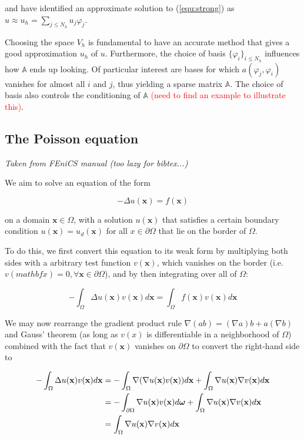 \documentclass[11pt, a4paper]{article}
\begin{document}
and have identified an approximate solution to (\ref{equ:strong}) as
$u \approx u_h = \sum_{j \leq N_h} u_j \varphi_j$.

Choosing the space $V_h$ is fundamental to have an accurate method that 
gives a good approximation $u_h$ of $u$. Furthermore, the choice of basis 
$\{\varphi_i\}_{i \leq N_h}$ influences how $\mathbb{A}$ ends up looking.
Of particular interest are bases for which $a(\varphi_j, \varphi_i)$ vanishes 
for almost all $i$ and $j$, thus yielding a sparse matrix $\mathbb{A}$. The
choice of basis also controls the conditioning of $\mathbb{A}$
\textcolor{red}{(need to find an example to illustrate this)}.

\subsection{The Poisson equation}
\label{subsec:poisson}

\textit{Taken from FEniCS manual (too lazy for bibtex...)}

We aim to solve an equation of the form

\begin{equation}
    - \Delta u(\mathbf{x}) = f(\mathbf{x}) \label{equ:poisson}
\end{equation}

on a domain $\mathbf{x} \in \Omega$, with a solution $u(\mathbf{x})$
that satisfies a certain boundary condition $u(\mathbf{x}) = u_d(\mathbf{x})$
for all $x \in \partial \Omega$ that lie on the border of $\Omega$.

To do this, we first convert this equation to its weak form
by multiplying both sides with a arbitrary test function
$v(\mathbf{x})$, which vanishes on the border (i.e. $v(mathbf{x}) = 0, \forall
\mathbf{x} \in \partial \Omega$), and by then integrating over all of $\Omega$:

\begin{equation}
    - \int_{\Omega} \Delta u(\mathbf{x}) v(\mathbf{x}) d\mathbf{x} = \int_{\Omega} f(\mathbf{x}) v(\mathbf{x}) d\mathbf{x} 
\end{equation}

We may now rearrange the gradient product rule $\nabla (a b) = (\nabla a) b + a (\nabla b)$ and
Gauss' theorem (as long as $v(x)$ is differentiable in a neighborhood of $\Omega$)
combined with the fact that $v(\mathbf{x})$ vanishes on $\partial
\Omega$ to convert the right-hand side to

\begin{align}
    - \int_{\Omega} \Delta u(\mathbf{x}) v(\mathbf{x}) d\mathbf{x} &= - \int_{\Omega} \nabla ( \nabla u(\mathbf{x}) v(\mathbf{x}) ) d\mathbf{x} + \int_{\Omega} \nabla u(\mathbf{x}) \nabla v(\mathbf{x}) d\mathbf{x} \notag \\ 
    &= - \int_{\partial \Omega} \nabla u(\mathbf{x}) v(\mathbf{x}) d\boldsymbol{\omega} + \int_{\Omega} \nabla u(\mathbf{x}) \nabla v(\mathbf{x}) d\mathbf{x} \notag \\ 
    &= \int_{\Omega} \nabla u(\mathbf{x}) \nabla v(\mathbf{x}) d\mathbf{x}
\end{align}
\end{document}
